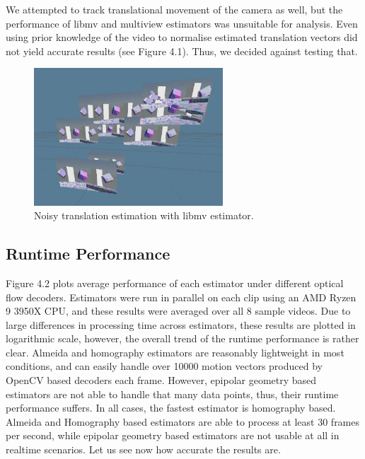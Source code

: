 \documentclass[11pt,english]{report}
\begin{document}
We attempted to track translational movement of the camera as well, but the performance of libmv and multiview estimators was unsuitable for analysis. Even using prior knowledge of the video to normalise estimated translation vectors did not yield accurate results (see Figure 4.1). Thus, we decided against testing that.

\begin{figure}[!ht]
	\centering
	\includegraphics[width=200pt]{docs/report/translation.jpg}
	\caption{\centering Noisy translation estimation with libmv estimator.}
\end{figure}

\subsection{Runtime Performance}

Figure 4.2 plots average performance of each estimator under different optical flow decoders. Estimators were run in parallel on each clip using an AMD Ryzen 9 3950X CPU, and these results were averaged over all 8 sample videos. Due to large differences in processing time across estimators, these results are plotted in logarithmic scale, however, the overall trend of the runtime performance is rather clear. Almeida and homography estimators are reasonably lightweight in most conditions, and can easily handle over 10000 motion vectors produced by OpenCV based decoders each frame. However, epipolar geometry based estimators are not able to handle that many data points, thus, their runtime performance suffers. In all cases, the fastest estimator is homography based. Almeida and Homography based estimators are able to process at least 30 frames per second, while epipolar geometry based estimators are not usable at all in realtime scenarios. Let us see now how accurate the results are.
\end{document}
